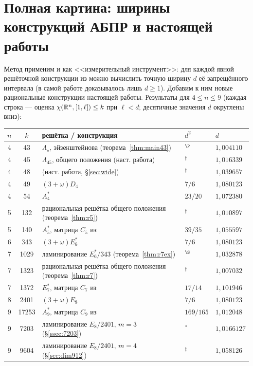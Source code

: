 \section{Полная картина: ширины конструкций АБПР и настоящей работы}\label{sec:extra}

Метод применим и как <<измерительный инструмент>>: для каждой явной решёточной
конструкции из \cite{ABPR} можно вычислить точную ширину $d$ её запрещённого
интервала (в самой работе доказывалось лишь $d\ge1$). Добавим к ним новые
рациональные конструкции настоящей работы. Результаты для $4\le n\le9$
(каждая строка --- оценка $\chi(\mathbb{R}^n,[1,\ell])\le k$ при $\ell<d$; десятичные
значения $d$ округлены вниз):

\begin{center}\small
\begin{tabular}{c c l l l}
\toprule
$n$ & $k$ & решётка / конструкция & $d^2$ & $d$\\
\midrule
4 & 43   & $\Lambda_\star$, эйзенштейнова (теорема~\ref{thm:main43})
  & $^{\P}$ & $1{,}004110$\\
4 & 45   & $\Lambda_{45}$, общего положения (наст. работа) & $^{\dagger}$ & $1{,}016339$\\
4 & 48   & (наст. работа, \S\ref{sec:wide}) & $^{\dagger}$ & $1{,}039657$\\
4 & 49   & $(3+\omega)D_4$ & $7/6$ & $1{,}080123$\\
4 & 54   & $A_4^*$ & $23/20$ & $1{,}072380$\\
5 & 132  & рациональная решётка общего положения (теорема~\ref{thm:r5})
  & $^{\dagger}$ & $1{,}010897$\\
5 & 140  & $A_5^*$, матрица $C_5$ из \cite{ABPR} & $39/35$ & $1{,}055597$\\
6 & 343  & $(3+\omega)E_6^*$ & $7/6$ & $1{,}080123$\\
7 & 1029 & ламинирование $E_6^*/343$ (теорема~\ref{thm:r7ex})
  & $^{\S}$ & $1{,}032878$\\
7 & 1323 & рациональная решётка общего положения (теорема~\ref{thm:r7})
  & $^{\dagger}$ & $1{,}007032$\\
7 & 1372 & $E_7^*$, матрица $C_7$ из \cite{ABPR} & $17/14$ & $1{,}101946$\\
8 & 2401 & $(3+\omega)E_8$ & $7/6$ & $1{,}080123$\\
9 & 17253& $A_9^*$, матрица $C_9$ из \cite{ABPR} & $169/165$ & $1{,}012048$\\
9 & 7203 & ламинирование $E_8/2401$, $m=3$ (\S\ref{ssec:7203})
  & $^{\ast}$ & $1{,}0166127$\\
9 & 9604 & ламинирование $E_8/2401$, $m=4$ (\S\ref{sec:dim912}) & $^{\ddagger}$ & $1{,}058126$\\
\bottomrule
\end{tabular}


\end{center}
